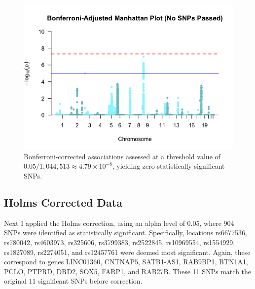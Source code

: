 \documentclass[12pt]{article}
\begin{document}


\begin{figure}
    \centering
    \includegraphics[width=1\linewidth]{Thesis_BonferroniCorrectedManhattanPlot.png}
   \caption{Bonferroni-corrected associations assessed at a threshold value of \(0.05 / 1{,}044{,}513 \approx 4.79 \times 10^{-8}\), yielding zero statistically significant SNPs.}
    \label{fig:enter-label}
\end{figure}
\clearpage


\subsection{Holms Corrected Data}
Next I applied the Holms correction, using an alpha level of 0.05, where 904 SNPs were identified as statistically significant. Specifically, locations rs6677536, rs780042, rs4603973, rs325606, rs3799383, rs2522845, rs10969554, rs1554929, rs1827089, rs2274051, and rs12457761 were deemed most significant. Again, these correspond to genes LINC01360, CNTNAP5, SATB1-AS1, RAB9BP1, BTN1A1, PCLO, PTPRD, DRD2, SOX5, FARP1, and RAB27B. These 11 SNPs match the original 11 significant SNPs before correction. \par
\end{document}
